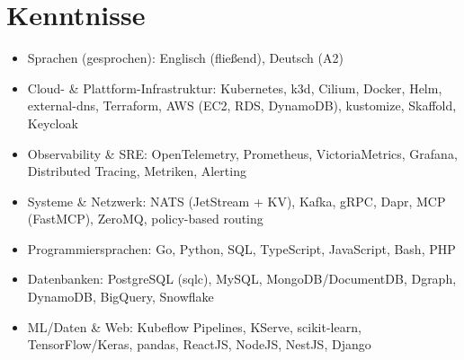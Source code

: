 \documentclass[10pt,a4paper]{resume}
\begin{document}
\section{Kenntnisse}

\begin{itemize}[leftmargin=1.4em,nosep,topsep=2pt]
  \item Sprachen (gesprochen): Englisch (fließend), Deutsch (A2)
  \item Cloud- \& Plattform-Infrastruktur: Kubernetes, k3d, Cilium, Docker, Helm, external-dns, Terraform, AWS (EC2, RDS, DynamoDB), kustomize, Skaffold, Keycloak
  \item Observability \& SRE: OpenTelemetry, Prometheus, VictoriaMetrics, Grafana, Distributed Tracing, Metriken, Alerting
  \item Systeme \& Netzwerk: NATS (JetStream + KV), Kafka, gRPC, Dapr, MCP (FastMCP), ZeroMQ, policy-based routing
  \item Programmiersprachen: Go, Python, SQL, TypeScript, JavaScript, Bash, PHP
  \item Datenbanken: PostgreSQL (sqlc), MySQL, MongoDB/DocumentDB, Dgraph, DynamoDB, BigQuery, Snowflake
  \item ML/Daten \& Web: Kubeflow Pipelines, KServe, scikit-learn, TensorFlow/Keras, pandas, ReactJS, NodeJS, NestJS, Django
\end{itemize}
\end{document}
